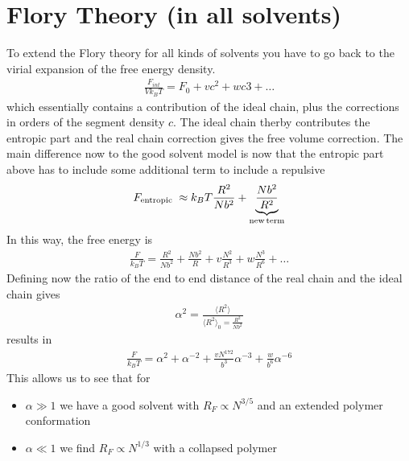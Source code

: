 \documentclass[letterpaper,10pt,english]{sphinxmanual}
\begin{document}
\section{Flory Theory (in all solvents)}
\label{\detokenize{notebooks/L22/1_real_polymers:Flory-Theory-(in-all-solvents)}}
\sphinxAtStartPar
To extend the Flory theory for all kinds of solvents you have to go back to the virial expansion of the free energy density.
\begin{equation*}
\begin{split}\frac{F_{int}}{V k_B T}=F_{0}+ vc^2+ wc3+\ldots\end{split}
\end{equation*}
\sphinxAtStartPar
which essentially contains a contribution of the ideal chain, plus the corrections in orders of the segment density \(c\). The ideal chain therby contributes the entropic part and the real chain correction gives the free volume correction. The main difference now to the good solvent model is now that the entropic part above has to include some additional term to include a repulsive
\begin{equation*}
\begin{split}F_{\text {entropic }} \approx k_B T \frac{R^{2}}{N b^{2}}+ \underbrace{\frac{Nb^2}{R^2}}_{\rm new\, term}\end{split}
\end{equation*}
\sphinxAtStartPar
In this way, the free energy is
\begin{equation*}
\begin{split}\frac{F}{k_BT}=\frac{R^2}{Nb^2}+\frac{Nb^2}{R}+v \frac{N^2}{R^3}+w \frac{N^3}{R^6}+\ldots\end{split}
\end{equation*}
\sphinxAtStartPar
Defining now the ratio of the end to end distance of the real chain and the ideal chain gives
\begin{equation*}
\begin{split}\alpha^2=\frac{\langle R^2\rangle}{\langle R^2\rangle_0=\frac{R^2}{Nb^2}}\end{split}
\end{equation*}
\sphinxAtStartPar
results in
\begin{equation*}
\begin{split}\frac{F}{k_B T}=\alpha^2+\alpha^{-2}+ \frac{vN^{172}}{b^3}\alpha^{-3}+\frac{w}{b^6}\alpha^{-6}\end{split}
\end{equation*}
\sphinxAtStartPar
This allows us to see that for
\begin{itemize}
\item {} 
\sphinxAtStartPar
\(\alpha \gg 1\) we have a good solvent with \(R_F\propto N^{3/5}\) and an extended polymer conformation

\item {} 
\sphinxAtStartPar
\(\alpha \ll 1\) we find \(R_F\propto N^{1/3}\) with a collapsed polymer

\end{itemize}
\end{document}
